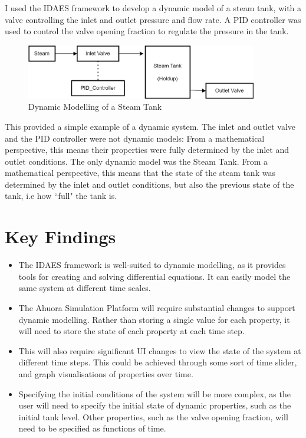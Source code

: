 \documentclass[12pt]{report}
\begin{document}
I used the IDAES framework to develop a dynamic model of a steam tank, with a valve controlling the inlet and outlet pressure and flow rate. A PID controller was used to control the valve opening fraction to regulate the pressure in the tank.

\begin{figure}
    \includegraphics[width=0.9\textwidth]{dynamicmodelling.png}
    \caption{Dynamic Modelling of a Steam Tank}
    \label{fig:dynamicmodelling}
\end{figure}

This provided a simple example of a dynamic system. The inlet and outlet valve and the PID controller were not dynamic models: From a mathematical perspective, this means their properties were fully determined by the inlet and outlet conditions. The only dynamic model was the Steam Tank. From a mathematical perspective, this means that the state of the steam tank was determined by the inlet and outlet conditions, but also the previous state of the tank, i.e how ``full" the tank is.


\section{Key Findings}

\begin{itemize}
    \item The IDAES framework is well-suited to dynamic modelling, as it provides tools for creating and solving differential equations. It can easily model the same system at different time scales.
    \item The Ahuora Simulation Platform will require substantial changes to support dynamic modelling. Rather than storing a single value for each property, it will need to store the state of each property at each time step.
    \item This will also require significant UI changes to view the state of the system at different time steps. This could be achieved through some sort of time slider, and graph visualisations of properties over time.
    \item Specifying the initial conditions of the system will be more complex, as the user will need to specify the initial state of dynamic properties, such as the initial tank level. Other properties, such as the valve opening fraction, will need to be specified as functions of time.
\end{itemize}
\end{document}
